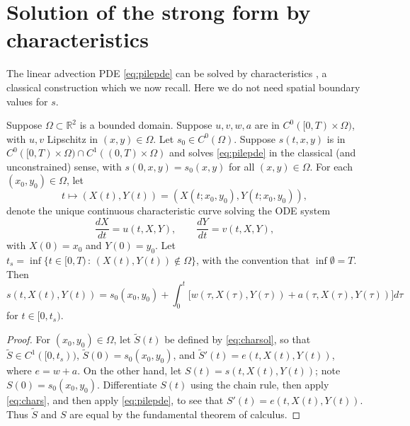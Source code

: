 \documentclass[hidelinks,onefignum,onetabnum,final]{siamart220329}  %
\newcommand{\RR}{\mathbb{R}}
\begin{document}
\section{Solution of the strong form by characteristics}

The linear advection PDE \eqref{eq:pilepde} can be solved by characteristics \cite[section 3.2]{Evans2010}, a classical construction which we now recall.  Here we do not need spatial boundary values for $s$.

\begin{lemma} \label{lem:chars}  Suppose $\Omega \subset \RR^2$ is a bounded domain.  Suppose $u,v,w,a$ are in $C^0([0,T) \times \Omega)$, with $u,v$ Lipschitz in $(x,y)\in\Omega$.  Let $s_0 \in C^0(\Omega)$.  Suppose $s(t,x,y)$ is in $C^0([0,T)\times \Omega) \cap C^1((0,T)\times \Omega)$ and solves \eqref{eq:pilepde} in the classical (and unconstrained) sense, with $s(0,x,y)=s_0(x,y)$ for all $(x,y)\in \Omega$.  For each $(x_0,y_0) \in \Omega$, let
    $$t \mapsto (X(t), Y(t)) = (X(t;x_0,y_0), Y(t;x_0,y_0)),$$
denote the unique continuous characteristic curve solving the ODE system
\begin{equation}
\frac{dX}{dt} = u(t,X,Y), \qquad \frac{dY}{dt} = v(t,X,Y), \label{eq:chars}
\end{equation}
with $X(0) = x_0$ and $Y(0) = y_0$.  Let $t_s = \inf \{t\in [0,T)\,:\, (X(t),Y(t))\notin\Omega\}$, with the convention that $\inf\emptyset=T$.  Then
\begin{equation}
s\!\left(t, X(t), Y(t)\right) = s_0(x_0,y_0)
  + \int_0^t \big[w\!\left(\tau, X(\tau), Y(\tau)\right) + a\!\left(\tau, X(\tau), Y(\tau)\right)\big] d\tau \label{eq:charsol}
\end{equation}
for $t\in[0,t_s)$.
\end{lemma}

\begin{proof}
For $(x_0,y_0)\in \Omega$, let $\tilde S(t)$ be defined by \eqref{eq:charsol}, so that $\tilde S\in C^1([0,t_s))$, $\tilde S(0)=s_0(x_0,y_0)$, and $\tilde S'(t)=e(t,X(t),Y(t))$, where $e=w+a$.  On the other hand, let $S(t)=s\!\left(t, X(t), Y(t)\right)$; note $S(0)=s_0(x_0,y_0)$.  Differentiate $S(t)$ using the chain rule, then apply \eqref{eq:chars}, and then apply \eqref{eq:pilepde}, to see that $S'(t)=e(t,X(t),Y(t))$.  Thus $\tilde S$ and $S$ are equal by the fundamental theorem of calculus.
\end{proof}
\end{document}
